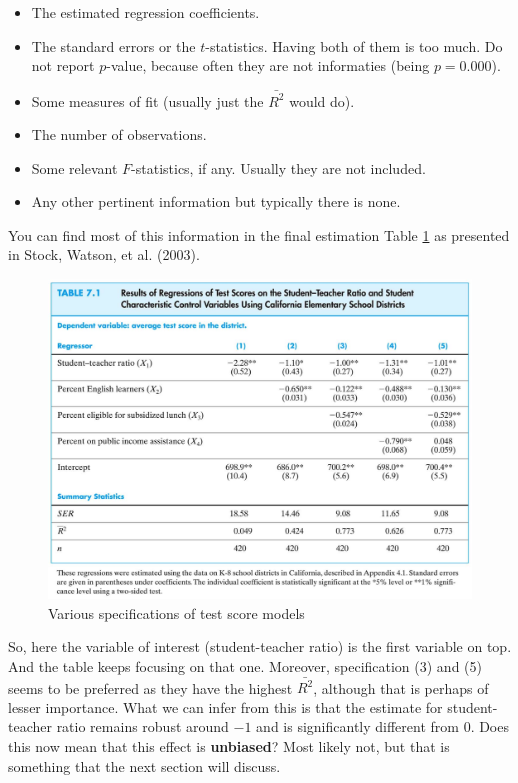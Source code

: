 \documentclass[
]{book}
\providecommand{\tightlist}{%
  \setlength{\itemsep}{0pt}\setlength{\parskip}{0pt}}
\begin{document}
\begin{itemize}
\tightlist
\item
  The estimated regression coefficients.
\item
  The standard errors or the \(t\)-statistics. Having both of them is too much. Do not report \(p\)-value, because often they are not informaties (being \(p = 0.000\)).
\item
  Some measures of fit (usually just the \(\bar{R^2}\) would do).
\item
  The number of observations.
\item
  Some relevant \(F\)-statistics, if any. Usually they are not included.
\item
  Any other pertinent information but typically there is none.
\end{itemize}

You can find most of this information in the final estimation Table \ref{fig:catable} as presented in Stock, Watson, et al. (2003).

\begin{figure}

{\centering \includegraphics[width=800px]{./figures/catable} 

}

\caption{Various specifications of test score models}\label{fig:catable}
\end{figure}

So, here the variable of interest (student-teacher ratio) is the first variable on top. And the table keeps focusing on that one. Moreover, specification (3) and (5) seems to be preferred as they have the highest \(\bar{R^2}\), although that is perhaps of lesser importance. What we can infer from this is that the estimate for student-teacher ratio remains robust around \(-1\) and is significantly different from \(0\). Does this now mean that this effect is \textbf{unbiased}? Most likely not, but that is something that the next section will discuss.
\end{document}
